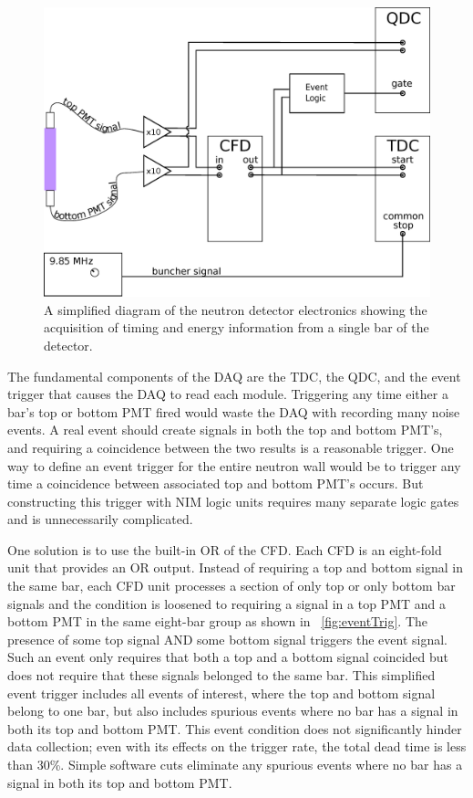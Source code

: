 \begin{figure}[htp]
\centering
\includegraphics[width=1.0\textwidth]{figures/basic_electronics.eps}
\caption[Simplified sketch of the detector electronics.]{A simplified diagram of the neutron detector electronics showing the acquisition of timing and energy information from a single bar of the detector.}
\label{fig:simpleElectronics}
\end{figure}

The fundamental components of the DAQ are the TDC, the QDC, and the event trigger that causes the DAQ to read each module.  Triggering any time either a bar's top or bottom PMT fired would waste the DAQ with recording many noise events.  A real event should create signals in both the top and bottom PMT's, and requiring a coincidence between the two results is a reasonable trigger.  One way to define an event trigger for the entire neutron wall would be to trigger any time a coincidence between associated top and bottom PMT's occurs.  But constructing this trigger with NIM logic units requires many separate logic gates and is unnecessarily complicated.  

One solution is to use the built-in OR of the CFD.  Each CFD is an eight-fold unit that provides an OR output.  Instead of requiring a top and bottom signal in the same bar, each CFD unit processes a section of only top or only bottom bar signals and the condition is loosened to requiring a signal in a top PMT and a bottom PMT in the same eight-bar group as shown in {\fig}~\ref{fig:eventTrig}.  The presence of some top signal AND some bottom signal triggers the event signal.  Such an event only requires that both a top and a bottom signal coincided but does not require that these signals belonged to the same bar.  This simplified event trigger includes all events of interest, where the top and bottom signal belong to one bar, but also includes spurious events where no bar has a signal in both its top and bottom PMT.  This event condition does not significantly hinder data collection; even with its effects on the trigger rate, the total dead time is less than 30\%.  Simple software cuts eliminate any spurious events where no bar has a signal in both its top and bottom PMT.

